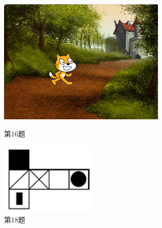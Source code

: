 \documentclass[10pt, a4paper]{article}
\begin{document}
\begin{enumerate}
        \begin{figure}[htbp]
            \centering
            \begin{minipage}[t]{.19\textwidth}
                \centering
                \includegraphics[width=\textwidth]{16.png}
                \caption*{第16题}
            \end{minipage}
            \begin{minipage}[t]{.19\textwidth}
                \centering
                \includegraphics[width=\textwidth]{18.png}
                \caption*{第18题}
            \end{minipage}
            \begin{minipage}[t]{.25\textwidth}
                \centering

\end{minipage}
\end{figure}
\end{enumerate}
\end{document}

